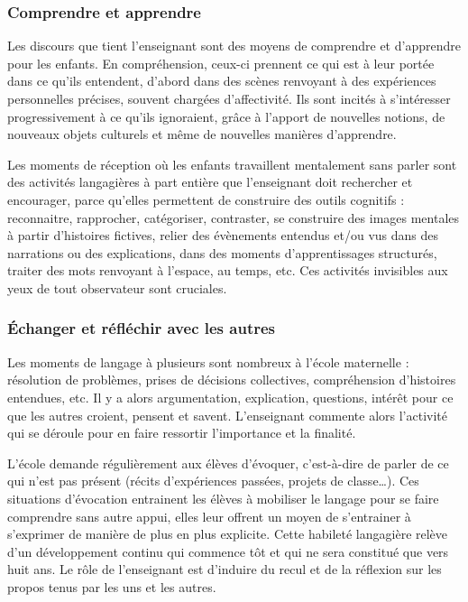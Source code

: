 \subsubsection{Comprendre et apprendre}
Les discours que tient l’enseignant sont des moyens de comprendre et d’apprendre pour les enfants. En compréhension, ceux-ci \og prennent \fg{} ce qui est à leur portée dans ce qu’ils entendent, d’abord dans des scènes renvoyant à des expériences personnelles précises, souvent chargées d’affectivité. Ils sont incités à s’intéresser progressivement à ce qu’ils ignoraient, grâce à l’apport de nouvelles notions, de nouveaux objets culturels et même de nouvelles manières d’apprendre. 

Les moments de réception où les enfants travaillent mentalement sans parler sont des activités langagières à part entière que l’enseignant doit rechercher et encourager, parce qu’elles permettent de construire des outils cognitifs : reconnaitre, rapprocher, catégoriser, contraster, se construire des images mentales à partir d’histoires fictives, relier des évènements entendus et/ou vus dans des narrations ou des explications, dans des moments d’apprentissages structurés, traiter des mots renvoyant à l’espace, au temps, etc. Ces activités invisibles aux yeux de tout observateur sont cruciales.

\subsubsection{Échanger et réfléchir avec les autres}
Les moments de langage à plusieurs sont nombreux à l’école maternelle : résolution de problèmes, prises de décisions collectives, compréhension d’histoires entendues, etc. Il y a alors argumentation, explication, questions, intérêt pour ce que les autres croient, pensent et savent. L’enseignant commente alors l’activité qui se déroule pour en faire ressortir l’importance et la finalité. 

L’école demande régulièrement aux élèves d’évoquer, c’est-à-dire de parler de ce qui n’est pas présent (récits d’expériences passées, projets de classe\dots). Ces situations d’évocation entrainent les élèves à mobiliser le langage pour se faire comprendre sans autre appui, elles leur offrent un moyen de s’entrainer à s’exprimer de manière de plus en plus explicite. Cette habileté langagière relève d’un développement continu qui commence tôt et qui ne sera constitué que vers huit ans. Le rôle de l’enseignant est d’induire du recul et de la réflexion sur les propos tenus par les uns et les autres.  

